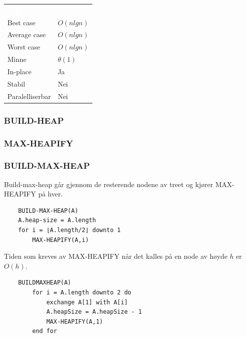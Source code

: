 \begin{table}[H]
    \label{tab:bubblesort}
    \centering
    \begin{tabular}{|L{15em} | L{15em}|}
        \hline
        \textbf{\textcolor{white}{Tilfelle}} & \textbf{\textcolor{white}{}}\\
        Best case & $O(n lg n)$\\
        Average case & $O(n lg n)$\\
        Worst case & $O(n lg n)$\\
        Minne & $\theta(1)$\\
        In-place & Ja\\
        Stabil & Nei\\
        Paralelliserbar & Nei\\
         \hline
    \end{tabular}
\end{table}

\subsubsection{BUILD-HEAP}

\subsubsection{MAX-HEAPIFY}

\subsubsection{BUILD-MAX-HEAP}
Build-max-heap går gjennom de resterende nodene av treet og kjører MAX-HEAPIFY på hver.

\begin{lstlisting}
    BUILD-MAX-HEAP(A)
	A.heap-size = A.length
	for i = ⌊A.length/2⌋ downto 1
		MAX-HEAPIFY(A,i)
\end{lstlisting}

\noindent Tiden som kreves av MAX-HEAPIFY når det kalles på en node av høyde $h$ er $O(h)$.

\begin{lstlisting}
    BUILDMAXHEAP(A)
        for i = A.length downto 2 do
	        exchange A[1] with A[i]
	        A.heapSize = A.heapSize - 1
	        MAX-HEAPIFY(A,1)
        end for
\end{lstlisting}

